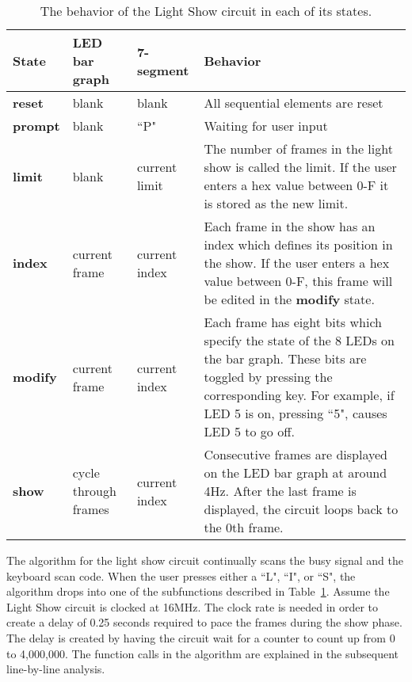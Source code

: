 \begin{table}
\begin{tabular}{l|l|l|p{2.0in}}
\textbf{ State }	& LED bar graph	& 7-segment	& Behavior 				\\ \hline \hline
\textbf{ reset }	& blank		& blank		& All sequential elements are reset 	\\ \hline
\textbf{ prompt }	& blank		& ``P"		& Waiting for user input		\\ \hline
\textbf{ limit }	& blank		& current limit	& The number of frames in the light show is called 
	the limit. If the user enters a hex value between 0-F it is stored as the new limit. \\  \hline
\textbf{ index }	& current frame	& current index	& Each frame in the show has an index which defines 
	its position in the show. If the user enters a hex value between 0-F, this frame will 
	be edited in the \textbf{ modify } state. 						\\ \hline
\textbf{ modify }	& current frame	& current index	& Each frame has eight bits which specify the state of 
	the 8 LEDs on the bar graph.  These bits are toggled by pressing the corresponding 
	key. For example, if LED 5 is on, pressing ``5", causes LED 5 
	to go off.								\\ \hline
\textbf{ show }	& cycle through frames & current index & Consecutive frames are displayed on the 
	LED bar graph at around 4Hz. After the last frame is displayed, the circuit loops 
	back to the 0th frame. 							\\ 
\end{tabular}
\caption{The behavior of the Light Show circuit in each of its states.}
\label{table:LSbehavior}
\end{table}

The algorithm for the light show circuit continually scans the busy signal 
and the keyboard scan code.  When the user presses either a ``L", 
``I", or ``S", 
the algorithm drops into one of the subfunctions described in 
Table~\ref{table:LSbehavior}.  Assume the Light Show circuit is
clocked at 16MHz.  The clock rate is needed in order to create a delay of
0.25 seconds required to pace the frames during the show phase.  The delay is
created by having the circuit wait for a counter to count up from 0 to 
4,000,000.  The function calls in the algorithm are explained in the 
subsequent line-by-line analysis.

